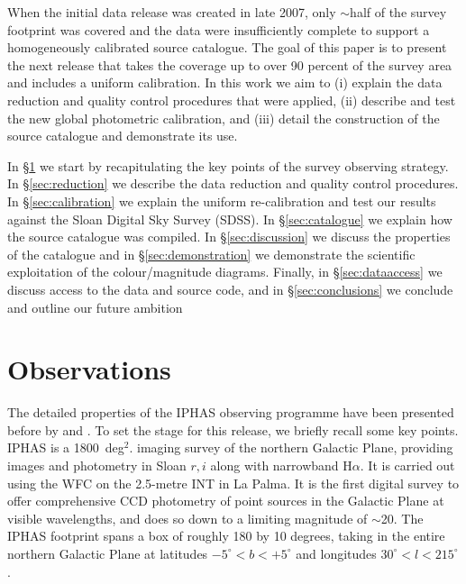 \documentclass[useAMS,usenatbib]{mn2e}
\begin{document}
When the initial data release was created in late 2007,
only $\sim$half of the survey footprint was covered
and the data were insufficiently complete 
to support a homogeneously calibrated source catalogue.
The goal of this paper is to present the next release 
that takes the coverage up to over 90 percent of the survey area 
and includes a uniform calibration.
In this work we aim to
(i) explain the data reduction 
and quality control procedures that were applied,
(ii) describe and test the new global photometric calibration, and 
(iii) detail the construction of the source catalogue
and demonstrate its use.

In \S\ref{sec:observations} we start by recapitulating the key points
of the survey observing strategy.
In \S\ref{sec:reduction} we describe the data reduction
and quality control procedures.
In \S\ref{sec:calibration} we explain the uniform re-calibration
and test our results against the Sloan Digital Sky Survey (SDSS).
In \S\ref{sec:catalogue} we explain how the source catalogue was compiled.
In \S\ref{sec:discussion} we discuss the properties of the catalogue
and in \S\ref{sec:demonstration} we demonstrate
the scientific exploitation of the colour/magnitude diagrams.
Finally, in \S\ref{sec:dataaccess} we discuss access
to the data and source code,
and in \S\ref{sec:conclusions} we conclude and outline
our future ambition

\section{Observations}
\label{sec:observations}

The detailed properties of the IPHAS observing programme 
have been presented before 
by \citet{Drew2005} and \citet{Gonzalez-Solares2008}. 
To set the stage for this release, we briefly recall some key points.
IPHAS is a 1800~deg$^2$. imaging survey of the northern Galactic Plane, 
providing images and photometry in Sloan $r, i$ 
along with narrowband H$\alpha$. 
It is carried out using the WFC 
on the 2.5-metre INT in La Palma. 
It is the first digital survey to offer comprehensive CCD photometry
of point sources in the Galactic Plane at visible wavelengths, 
and does so down to a limiting magnitude of $\sim$20.
The IPHAS footprint spans a box 
of roughly 180 by 10 degrees, 
taking in the entire northern Galactic Plane 
at latitudes $-5^{\circ} < b < +5^{\circ}$ 
and longitudes $30^{\circ} < l < 215^{\circ}$.
\end{document}
